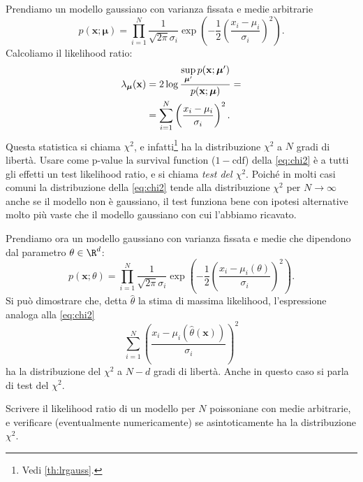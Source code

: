 
Prendiamo un modello gaussiano con varianza fissata e medie arbitrarie
\begin{equation*}
	p(\mathbf x;\boldsymbol\mu)
	= \prod_{i=1}^N \frac1{\sqrt{2\pi}\sigma_i}
	\exp\left(-\frac12\left(\frac{x_i-\mu_i}{\sigma_i}\right)^2\right).
\end{equation*}
Calcoliamo il likelihood ratio:
\begin{align}
	\lambda_{\boldsymbol\mu}(\mathbf x)
	&= 2\log \frac
	{\sup\limits_{\boldsymbol\mu'} p(\mathbf x;\boldsymbol\mu')}
	{p(\mathbf x;\boldsymbol\mu)} = \notag \\
	&= \sum_{i=1}^N \left(\frac{x_i-\mu_i}{\sigma_i}\right)^2. \label{eq:chi2}
\end{align}
Questa statistica si chiama $\chi^2$,
e infatti\footnote{Vedi \autoref{th:lrgauss}.} ha la distribuzione $\chi^2$ a $N$ gradi di libertà.
Usare come p-value la survival function ($1-\text{cdf}$) della \eqref{eq:chi2}
è a tutti gli effetti un test likelihood ratio,
e si chiama \emph{test del $\chi^2$}.
Poiché in molti casi comuni la distribuzione della \eqref{eq:chi2} tende alla distribuzione $\chi^2$
per $N\to\infty$ anche se il modello non è gaussiano,
il test funziona bene con ipotesi alternative molto più vaste che il modello gaussiano con cui l'abbiamo ricavato.

Prendiamo ora un modello gaussiano con varianza fissata e medie che dipendono dal parametro $\theta\in\R^d$:
\begin{equation*}
	p(\mathbf x;\theta)
	= \prod_{i=1}^N \frac1{\sqrt{2\pi}\sigma_i}
	\exp\left(-\frac12\left(\frac{x_i-\mu_i(\theta)}{\sigma_i}\right)^2\right).
\end{equation*}
Si può dimostrare che,
detta $\hat\theta$ la stima di massima likelihood,
l'espressione analoga alla \eqref{eq:chi2}
\begin{equation*}
	\sum_{i=1}^N \left( \frac {x_i-\mu_i(\hat\theta(\mathbf x))} {\sigma_i} \right)^2
\end{equation*}
%
ha la distribuzione del $\chi^2$ a $N-d$ gradi di libertà.
Anche in questo caso si parla di test del $\chi^2$.

\begin{exercise}
	Scrivere il likelihood ratio di un modello per $N$ poissoniane con medie arbitrarie,
	e verificare (eventualmente numericamente) se asintoticamente ha la distribuzione $\chi^2$.
\end{exercise}
